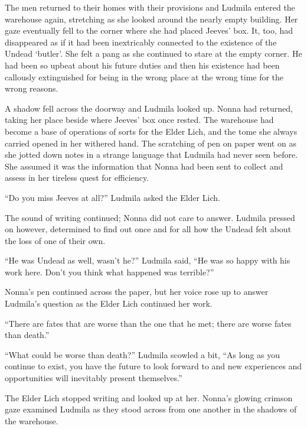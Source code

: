  

The men returned to their homes with their provisions and Ludmila entered the warehouse again, stretching as she looked around the nearly empty building. Her gaze eventually fell to the corner where she had placed Jeeves’ box. It, too, had disappeared as if it had been inextricably connected to the existence of the Undead ‘butler’. She felt a pang as she continued to stare at the empty corner. He had been so upbeat about his future duties and then his existence had been callously extinguished for being in the wrong place at the wrong time for the wrong reasons.

 

A shadow fell across the doorway and Ludmila looked up. Nonna had returned, taking her place beside where Jeeves’ box once rested. The warehouse had become a base of operations of sorts for the Elder Lich, and the tome she always carried opened in her withered hand. The scratching of pen on paper went on as she jotted down notes in a strange language that Ludmila had never seen before. She assumed it was the information that Nonna had been sent to collect and assess in her tireless quest for efficiency.

 

“Do you miss Jeeves at all?” Ludmila asked the Elder Lich.

 

The sound of writing continued; Nonna did not care to answer. Ludmila pressed on however, determined to find out once and for all how the Undead felt about the loss of one of their own.

 

“He was Undead as well, wasn’t he?” Ludmila said, “He was so happy with his work here. Don’t you think what happened was terrible?”

 

Nonna’s pen continued across the paper, but her voice rose up to answer Ludmila’s question as the Elder Lich continued her work.

 

“There are fates that are worse than the one that he met; there are worse fates than death.”

 

“What could be worse than death?” Ludmila scowled a bit, “As long as you continue to exist, you have the future to look forward to and new experiences and opportunities will inevitably present themselves.”

 

The Elder Lich stopped writing and looked up at her. Nonna’s glowing crimson gaze examined Ludmila as they stood across from one another in the shadows of the warehouse.

